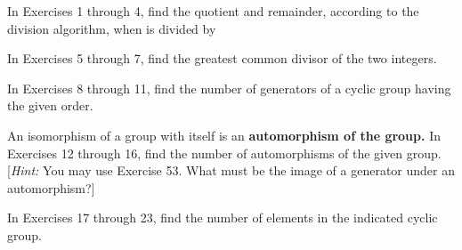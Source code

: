 \documentclass[11pt,oneside]{article}
\begin{document}
\BookNarrativefalse

\begin{BookBody}



\noindent In Exercises 1 through 4, find the quotient and remainder, according to the division algorithm, when  is divided by 





\noindent In Exercises 5 through 7, find the greatest common divisor of the two integers.




\noindent In Exercises 8 through 11, find the number of generators of a cyclic group having the given order.





\noindent An isomorphism of a group with itself is an\textbf{ automorphism of the group.} In Exercises 12 through 16, find the number of automorphisms of the given group. [\textit{Hint:} You may use Exercise 53. What must be the image of a generator under an automorphism?]






\noindent In Exercises 17 through 23, find the number of elements in the indicated cyclic group.



\end{BookBody}
\end{document}
